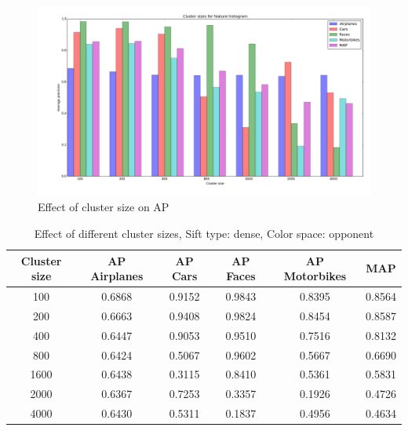 \begin{figure}[H]
\includegraphics[scale=0.40]{plots/cluster_size_feature_histograms}
\caption{Effect of cluster size on AP}
\end{figure}
\begin{table}[H]
\begin{tabular}{|c|ccccc|}
\hline
\textbf{Cluster size} & \textbf{AP Airplanes} & \textbf{AP Cars} & \textbf{AP Faces} & \textbf{AP Motorbikes} & \textbf{MAP}\\
\hline
100& 0.6868 & 0.9152 & 0.9843 & 0.8395 & 0.8564\\
200 & 0.6663 & 0.9408 & 0.9824 & 0.8454 & 0.8587\\
400 & 0.6447 & 0.9053 & 0.9510 & 0.7516 & 0.8132\\
800 & 0.6424 & 0.5067 & 0.9602 & 0.5667 & 0.6690\\
1600 & 0.6438 & 0.3115 & 0.8410 & 0.5361 & 0.5831\\
2000 & 0.6367 & 0.7253 & 0.3357 & 0.1926 & 0.4726\\
4000 & 0.6430 & 0.5311 & 0.1837 & 0.4956 & 0.4634\\
\hline
\end{tabular}
\caption{Effect of different cluster sizes, Sift type: dense, Color space: opponent}
\end{table}

